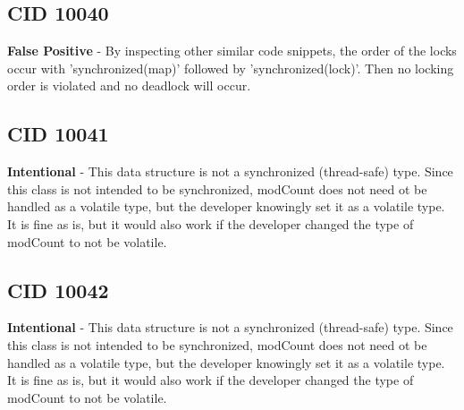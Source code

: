 \documentclass[12pt]{article}
\begin{document}
\subsection{CID 10040}
\textbf{False Positive} - By inspecting other similar code snippets, the order of the locks occur with 'synchronized(map)' followed by 'synchronized(lock)'. Then no locking order is violated and no deadlock will occur.
\subsection{CID 10041}
\textbf{Intentional} - This data structure is not a synchronized (thread-safe) type. Since this class is not intended to be synchronized, modCount does not need ot be handled as a volatile type, but the developer knowingly set it as a volatile type. It is fine as is, but it would also work if the developer changed the type of modCount to not be volatile.
\subsection{CID 10042}
\textbf{Intentional} - This data structure is not a synchronized (thread-safe) type. Since this class is not intended to be synchronized, modCount does not need ot be handled as a volatile type, but the developer knowingly set it as a volatile type. It is fine as is, but it would also work if the developer changed the type of modCount to not be volatile.
\end{document}
